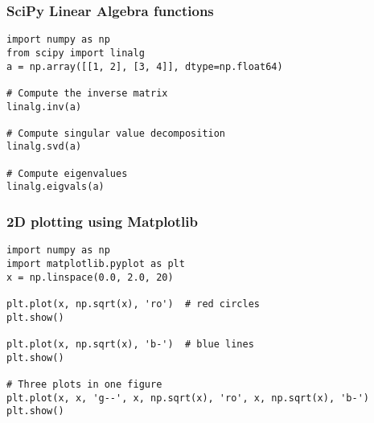 \documentclass[10pt]{beamer}
\begin{document}
\begin{frame}[fragile]
\frametitle{SciPy Linear Algebra functions}
\begin{verbatim}
import numpy as np
from scipy import linalg
a = np.array([[1, 2], [3, 4]], dtype=np.float64)

# Compute the inverse matrix
linalg.inv(a)

# Compute singular value decomposition
linalg.svd(a)

# Compute eigenvalues
linalg.eigvals(a)
\end{verbatim}
\end{frame}

\begin{frame}[fragile]
\frametitle{2D plotting using Matplotlib}
\begin{verbatim}
import numpy as np
import matplotlib.pyplot as plt
x = np.linspace(0.0, 2.0, 20)

plt.plot(x, np.sqrt(x), 'ro')  # red circles
plt.show()

plt.plot(x, np.sqrt(x), 'b-')  # blue lines
plt.show()

# Three plots in one figure
plt.plot(x, x, 'g--', x, np.sqrt(x), 'ro', x, np.sqrt(x), 'b-')
plt.show()
\end{verbatim}
\end{frame}
\end{document}

